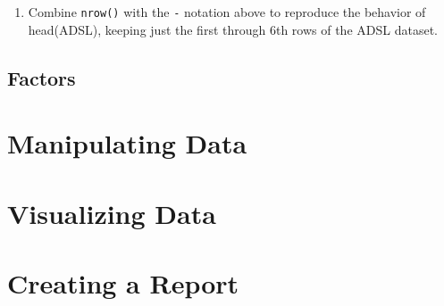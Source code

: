 \documentclass[]{book}
\providecommand{\tightlist}{%
  \setlength{\itemsep}{0pt}\setlength{\parskip}{0pt}}
\begin{document}
\begin{enumerate}
\def\labelenumi{\arabic{enumi}.}
\setcounter{enumi}{2}
\tightlist
\item
  Combine \texttt{nrow()} with the \texttt{-} notation above to reproduce the behavior of head(ADSL), keeping just the first through 6th rows of the ADSL dataset.
\end{enumerate}

\hypertarget{factors}{%
\section{Factors}\label{factors}}

\hypertarget{manipulating-data}{%
\chapter{Manipulating Data}\label{manipulating-data}}

\hypertarget{visualizing-data}{%
\chapter{Visualizing Data}\label{visualizing-data}}

\hypertarget{creating-a-report}{%
\chapter{Creating a Report}\label{creating-a-report}}


\end{document}
